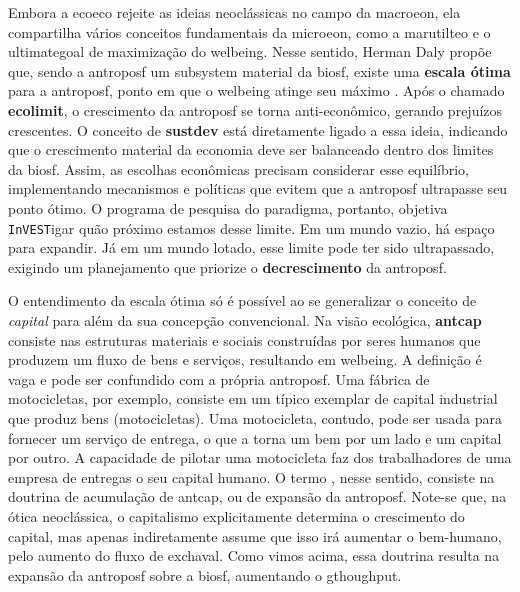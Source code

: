 \documentclass[./main.tex]{subfiles}
\begin{document}
\par Embora a \gls{ecoeco} rejeite as ideias neoclássicas no campo da \gls{macroeon}, ela compartilha vários conceitos fundamentais da \gls{microeon}, como a \gls{marutilteo} e o \gls{ultimategoal} de maximização do \gls{welbeing}. Nesse sentido, Herman Daly propõe que, sendo a \gls{antroposf} um sub\gls{system} material da \gls{biosf}, existe uma \textbf{escala ótima} para a \gls{antroposf}, ponto em que o \gls{welbeing} atinge seu máximo \cite{Daly2015a}. Após o chamado \textbf{\gls{ecolimit}}, o crescimento da \gls{antroposf} se torna anti-econômico, gerando prejuízos crescentes. O conceito de \textbf{\gls{sustdev}} está diretamente ligado a essa ideia, indicando que o crescimento material da economia deve ser balanceado dentro dos limites da \gls{biosf}. Assim, as escolhas econômicas precisam considerar esse equilíbrio, implementando mecanismos e políticas que evitem que a \gls{antroposf} ultrapasse seu ponto ótimo. O programa de pesquisa do \gls{paradigma}, portanto, objetiva \texttt{InVEST}igar quão próximo estamos desse limite. Em um mundo vazio, há espaço para expandir. Já em um mundo lotado, esse limite pode ter sido ultrapassado, exigindo um planejamento que priorize o \textbf{decrescimento} da \gls{antroposf}.

\par O entendimento da escala ótima só é possível ao se generalizar o conceito de \textit{capital} para além da sua concepção convencional. Na visão ecológica, \textbf{\gls{antcap}} consiste nas estruturas materiais e sociais construídas por seres humanos que produzem um fluxo de bens e serviços, resultando em \gls{welbeing}. A definição é vaga e pode ser confundido com a própria \gls{antroposf}. Uma fábrica de motocicletas, por exemplo, consiste em um típico exemplar de capital industrial que produz bens (motocicletas). Uma motocicleta, contudo, pode ser usada para fornecer um serviço de entrega, o que a torna um bem por um lado e um capital por outro. A capacidade de pilotar uma motocicleta faz dos trabalhadores de uma empresa de entregas o seu capital humano. O termo , nesse sentido, consiste na doutrina de acumulação de \gls{antcap}, ou de expansão da \gls{antroposf}. Note-se que, na ótica neoclássica, o capitalismo explicitamente determina o crescimento do capital, mas apenas indiretamente assume que isso irá aumentar o bem-humano, pelo aumento do fluxo de \gls{exchaval}. Como vimos acima, essa doutrina resulta na expansão da \gls{antroposf} sobre a \gls{biosf}, aumentando o \gls{gthoughput}. 
\end{document}
